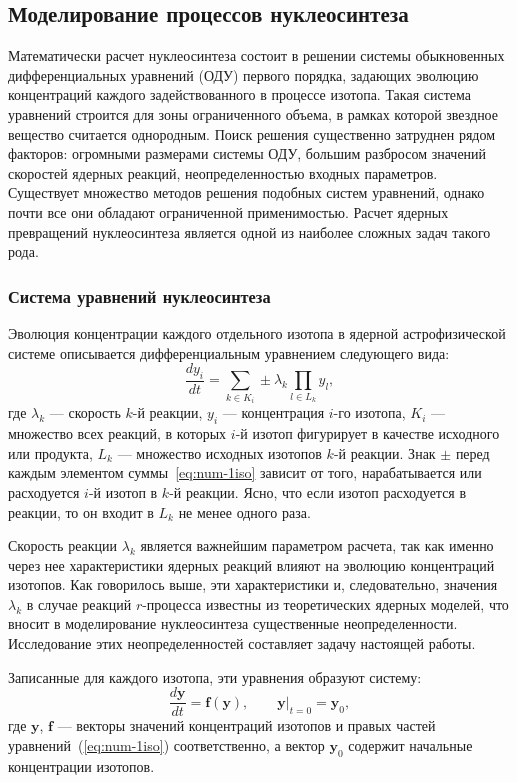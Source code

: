 \subsection{Моделирование процессов нуклеосинтеза}
Математически расчет нуклеосинтеза состоит в решении системы обыкновенных дифференциальных уравнений (ОДУ) первого порядка, задающих эволюцию концентраций каждого задействованного в процессе изотопа. Такая система уравнений строится для зоны ограниченного объема, в рамках которой звездное вещество считается однородным. Поиск решения существенно затруднен рядом факторов: огромными размерами системы ОДУ, большим разбросом значений скоростей ядерных реакций, неопределенностью входных параметров. Существует множество методов решения подобных систем уравнений, однако почти все они обладают ограниченной применимостью. Расчет ядерных превращений нуклеосинтеза является одной из наиболее сложных задач такого рода.

\subsubsection{Система уравнений нуклеосинтеза}
Эволюция концентрации каждого отдельного изотопа в ядерной астрофизической системе описывается дифференциальным уравнением следующего вида:
\begin{equation}
\displaystyle \frac{d y_i}{d t} = \sum_{k \in K_i} \pm \lambda_k \prod_{l \in L_k} y_l,
\label{eq:num-1iso}
\end{equation}
где $\lambda_k$ --- скорость $k$-й реакции, $y_i$ --- концентрация $i$-го изотопа,  $K_i$ --- множество всех реакций, в которых $i$-й изотоп фигурирует в качестве исходного или продукта, $L_k$ --- множество исходных изотопов $k$-й реакции. Знак $\pm$ перед каждым элементом суммы~\ref{eq:num-1iso} зависит от того, нарабатывается или расходуется $i$-й изотоп в $k$-й реакции. Ясно, что если изотоп расходуется в реакции, то он входит в $L_k$ не менее одного раза.

Скорость реакции $\lambda_k$ является важнейшим параметром расчета, так как именно через нее характеристики ядерных реакций влияют на эволюцию концентраций изотопов. Как говорилось выше, эти характеристики и, следовательно, значения $\lambda_k$ в случае реакций $r$-процесса известны из теоретических ядерных моделей, что вносит в моделирование нуклеосинтеза существенные неопределенности. Исследование этих неопределенностей составляет задачу настоящей работы.

Записанные для каждого изотопа, эти уравнения образуют систему:
\begin{equation}
\displaystyle
\frac{d \bm{y}}{d t} = \bm{f}(\bm{y}), \qquad \bm{y} \bigg\rvert_{t=0} = \bm{y}_0,
\label{eq:num-system}
\end{equation}
где $\bm{y}$, $\bm{f}$ --- векторы значений концентраций изотопов и правых частей уравнений~(\ref{eq:num-1iso}) соответственно, а вектор $\bm{y}_0$ содержит начальные концентрации изотопов. 

